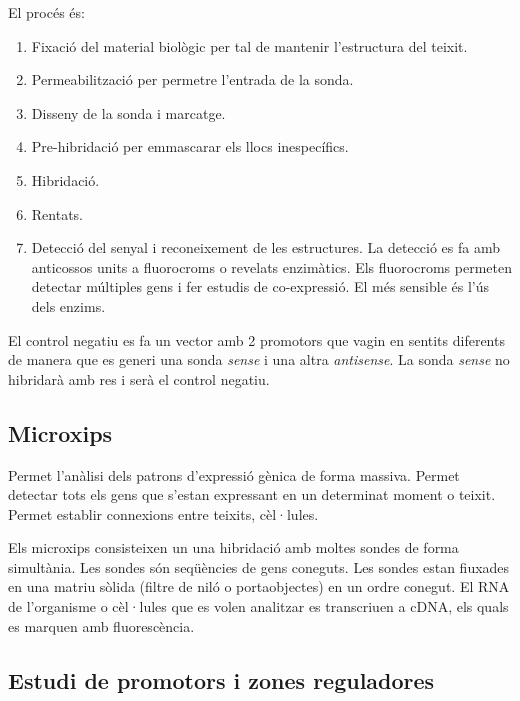 El procés és:
\begin{enumerate}
\item Fixació del material biològic per tal de mantenir l'estructura
  del teixit.
\item Permeabilització per permetre l'entrada de la sonda.
\item Disseny de la sonda i marcatge.
\item Pre-hibridació per emmascarar els llocs inespecífics.
\item Hibridació.
\item Rentats.
\item Detecció del senyal i reconeixement de les estructures. La
  detecció es fa amb anticossos units a fluorocroms o revelats
  enzimàtics. Els fluorocroms permeten detectar múltiples gens i fer
  estudis de co-expressió. El més sensible és l'ús dels enzims.
\end{enumerate}

El control negatiu es fa un vector amb 2 promotors que vagin en
sentits diferents de manera que es generi una sonda \textit{sense} i
una altra \textit{antisense}. La sonda \textit{sense} no hibridarà amb
res i serà el control negatiu.

\subsection{Microxips}
\label{sec:microxips}
Permet l'anàlisi dels patrons d'expressió gènica de forma
massiva. Permet detectar tots els gens que s'estan expressant en un
determinat moment o teixit. Permet establir connexions entre teixits,
cèl·lules.

Els microxips consisteixen un una hibridació amb moltes sondes de
forma simultània. Les sondes són seqüències de gens coneguts. Les
sondes estan fiuxades en una matriu sòlida (filtre de niló o
portaobjectes) en un ordre conegut. El RNA de l'organisme o cèl·lules
que es volen analitzar es transcriuen a cDNA, els quals es marquen amb
fluorescència.

\subsection{Estudi de promotors i zones reguladores}
\label{sec:estudi-de-zones}
